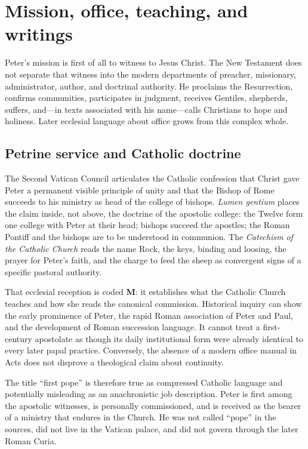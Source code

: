 \section{Mission, office, teaching, and writings}\label{sec:peter-office}

Peter's mission is first of all to witness to Jesus Christ. The New Testament
does not separate that witness into the modern departments of preacher,
missionary, administrator, author, and doctrinal authority. He proclaims the
Resurrection, confirms communities, participates in judgment, receives
Gentiles, shepherds, suffers, and---in texts associated with his name---calls
Christians to hope and holiness. Later ecclesial language about office grows
from this complex whole.

\subsection{Petrine service and Catholic doctrine}

The Second Vatican Council articulates the Catholic confession that Christ
gave Peter a permanent visible principle of
unity and that the Bishop of Rome succeeds to his ministry as head of the
college of bishops. \emph{Lumen gentium} places the claim inside, not above,
the doctrine of the apostolic college: the Twelve form one college with Peter
at their head; bishops succeed the apostles; the Roman Pontiff and the bishops
are to be understood in communion. The \emph{Catechism of the Catholic
Church} reads the name Rock, the keys, binding and loosing, the prayer for
Peter's faith, and the charge to feed the sheep as convergent signs of a
specific pastoral authority.

That ecclesial reception is coded \textbf{M}: it establishes what the Catholic
Church teaches and how she reads the canonical commission. Historical inquiry
can show the early prominence of Peter, the rapid Roman association of Peter
and Paul, and the development of Roman succession language. It cannot treat a
first-century apostolate as though its daily institutional form were already
identical to every later papal practice. Conversely, the absence of a modern
office manual in Acts does not disprove a theological claim about continuity.

The title ``first pope'' is therefore true as compressed Catholic language and
potentially misleading as an anachronistic job description. Peter is first
among the apostolic witnesses, is personally commissioned, and is received as
the bearer of a ministry that endures in the Church. He was not called
``pope'' in the sources, did not live in the Vatican palace, and did not govern
through the later Roman Curia.

